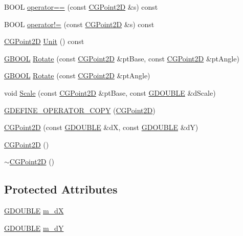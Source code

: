 \begin{DoxyCompactItemize}
\item 
B\+O\+O\+L \hyperlink{class_c_g_point2_d_ae8fcfecb3c2652f2093f1edc4ce66c5b}{operator==} (const \hyperlink{class_c_g_point2_d}{C\+G\+Point2\+D} \&s) const 
\item 
B\+O\+O\+L \hyperlink{class_c_g_point2_d_a160e4a5c67a9ce23c750600cabf1a967}{operator!=} (const \hyperlink{class_c_g_point2_d}{C\+G\+Point2\+D} \&s) const 
\item 
\hyperlink{class_c_g_point2_d}{C\+G\+Point2\+D} \hyperlink{class_c_g_point2_d_a95953376490cc261f288f736e2376393}{Unit} () const 
\item 
\hyperlink{_g_types_8h_a2901915743626352a6820c5405f556dc}{G\+B\+O\+O\+L} \hyperlink{class_c_g_point2_d_a7795d4408d2cfc2b629766e5811428c1}{Rotate} (const \hyperlink{class_c_g_point2_d}{C\+G\+Point2\+D} \&pt\+Base, const \hyperlink{class_c_g_point2_d}{C\+G\+Point2\+D} \&pt\+Angle)
\item 
\hyperlink{_g_types_8h_a2901915743626352a6820c5405f556dc}{G\+B\+O\+O\+L} \hyperlink{class_c_g_point2_d_afba0fee163950c4bfd52b51cb52079e2}{Rotate} (const \hyperlink{class_c_g_point2_d}{C\+G\+Point2\+D} \&pt\+Angle)
\item 
void \hyperlink{class_c_g_point2_d_aea4e7c5405e11e6040b4ac4bc441a9be}{Scale} (const \hyperlink{class_c_g_point2_d}{C\+G\+Point2\+D} \&pt\+Base, const \hyperlink{_g_types_8h_afd05ac85f90ee8e2a733928545462cd4}{G\+D\+O\+U\+B\+L\+E} \&d\+Scale)
\item 
\hyperlink{class_c_g_point2_d_ad353ae77b0f2195bd3a35cbca3c70b76}{G\+D\+E\+F\+I\+N\+E\+\_\+\+O\+P\+E\+R\+A\+T\+O\+R\+\_\+\+C\+O\+P\+Y} (\hyperlink{class_c_g_point2_d}{C\+G\+Point2\+D})
\item 
\hyperlink{class_c_g_point2_d_ab6bc36c379f9a094dbecf5573feefc5c}{C\+G\+Point2\+D} (const \hyperlink{_g_types_8h_afd05ac85f90ee8e2a733928545462cd4}{G\+D\+O\+U\+B\+L\+E} \&d\+X, const \hyperlink{_g_types_8h_afd05ac85f90ee8e2a733928545462cd4}{G\+D\+O\+U\+B\+L\+E} \&d\+Y)
\item 
\hyperlink{class_c_g_point2_d_a2b8ee61153e1325e1f6d63569e86c245}{C\+G\+Point2\+D} ()
\item 
\hyperlink{class_c_g_point2_d_a96c89bff0fbc9159fc5bfd9d67f55fae}{$\sim$\+C\+G\+Point2\+D} ()
\end{DoxyCompactItemize}
\subsection*{Protected Attributes}
\begin{DoxyCompactItemize}
\item 
\hyperlink{_g_types_8h_afd05ac85f90ee8e2a733928545462cd4}{G\+D\+O\+U\+B\+L\+E} \hyperlink{class_c_g_point2_d_a9b0af0e6a6034eb284242443db4d7c01}{m\+\_\+d\+X}
\item 
\hyperlink{_g_types_8h_afd05ac85f90ee8e2a733928545462cd4}{G\+D\+O\+U\+B\+L\+E} \hyperlink{class_c_g_point2_d_a7701a5b97efab581f7ae8a30d43ff536}{m\+\_\+d\+Y}
\end{DoxyCompactItemize}


